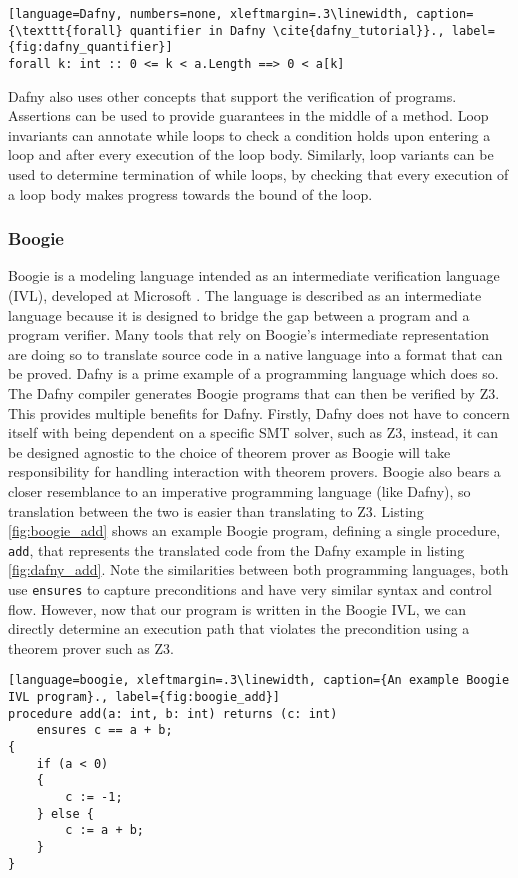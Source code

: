 \begin{lstlisting}[language=Dafny, numbers=none, xleftmargin=.3\linewidth, caption={\texttt{forall} quantifier in Dafny \cite{dafny_tutorial}}., label={fig:dafny_quantifier}]
forall k: int :: 0 <= k < a.Length ==> 0 < a[k]
\end{lstlisting}
\par
Dafny also uses other concepts that support the verification of programs. Assertions can be used to provide guarantees in the middle of a method. Loop invariants can annotate while loops to check a condition holds upon entering a loop and after every execution of the loop body. Similarly, loop variants can be used to determine termination of while loops, by checking that every execution of a loop body makes progress towards the bound of the loop.
\subsubsection{Boogie}
Boogie is a modeling language intended as an intermediate verification language (IVL), developed at Microsoft \cite{boogie}. The language is described as an intermediate language because it is designed to bridge the gap between a program and a program verifier. Many tools that rely on Boogie's intermediate representation are doing so to translate source code in a native language into a format that can be proved. Dafny is a prime example of a programming language which does so. The Dafny compiler generates Boogie programs that can then be verified by Z3. This provides multiple benefits for Dafny. Firstly, Dafny does not have to concern itself with being dependent on a specific SMT solver, such as Z3, instead, it can be designed agnostic to the choice of theorem prover as Boogie will take responsibility for handling interaction with theorem provers. Boogie also bears a closer resemblance to an imperative programming language (like Dafny), so translation between the two is easier than translating to Z3. Listing \ref{fig:boogie_add} shows an example Boogie program, defining a single procedure, \texttt{add}, that represents the translated code from the Dafny example in listing \ref{fig:dafny_add}. Note the similarities between both programming languages, both use \texttt{ensures} to capture preconditions and have very similar syntax and control flow. However, now that our program is written in the Boogie IVL, we can directly determine an execution path that violates the precondition using a theorem prover such as Z3.
\begin{lstlisting}[language=boogie, xleftmargin=.3\linewidth, caption={An example Boogie IVL program}., label={fig:boogie_add}]
procedure add(a: int, b: int) returns (c: int)
    ensures c == a + b;
{
    if (a < 0) 
    {
        c := -1;
    } else {
        c := a + b;
    }
}
\end{lstlisting}

